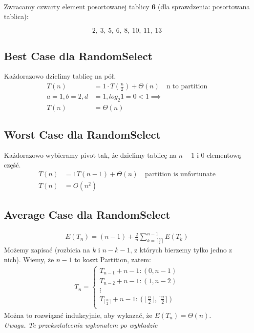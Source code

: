 \documentclass{article}
\numberwithin{equation}{subsection}
\begin{document}
\noindent
Zwracamy czwarty element posortowanej tablicy \textbf{6} (dla sprawdzenia: posortowana tablica):

\[
2,\ 3,\ 5,\ 6,\ 8,\ 10,\ 11,\ 13
\]

\subsection{Best Case dla RandomSelect}

Każdorazowo dzielimy tablicę na pół.
\begin{align}
    T(n) &= 1\cdot T\left(\frac{n}{2}\right) + \Theta(n) \quad \text{n to partition}\\
    a = 1, b =2, d &= 1, log_2 1 = 0 < 1 \implies \\ T(n) &= \Theta(n)
\end{align}

\subsection{Worst Case dla RandomSelect}

Każdorazowo wybieramy pivot tak, że dzielimy tablicę na $n-1$ i $0$-elementową część.
\begin{align}
    T(n) &= 1T\left(n-1\right) + \Theta(n) \quad \text{partition is unfortunate}\\
    T(n) &= O(n^2)
\end{align}

\subsection{Average Case dla RandomSelect}

\begin{align}
    E(T_n) = (n-1) + \frac{2}{n} \sum_{k=\lceil \frac{n}{2} \rceil}^{n-1} E(T_k)
\end{align}
Możemy zapisać (rozbicia na $k$ i $n-k-1$, z których bierzemy tylko jedno z nich). Wiemy, że $n-1$ to koszt Partition, zatem:
\begin{align}
    T_n = \begin{cases}
        T_{n-1} + n-1 : (0,n-1)\\
        T_{n-2} + n-1 : (1,n-2)\\
        \vdots\\
        T_{\lceil\frac{n}{2}\rceil} + n-1 : (\lfloor \frac{n}{2} \rfloor, \lceil \frac{n}{2} \rceil)\\
    \end{cases}
\end{align}
Można to rozwiązać indukcyjnie, aby wykazać, że $E(T_n) = \Theta(n)$.\\
\textit{Uwaga. Te przekształcenia wykonałem po wykładzie}\\
\end{document}
